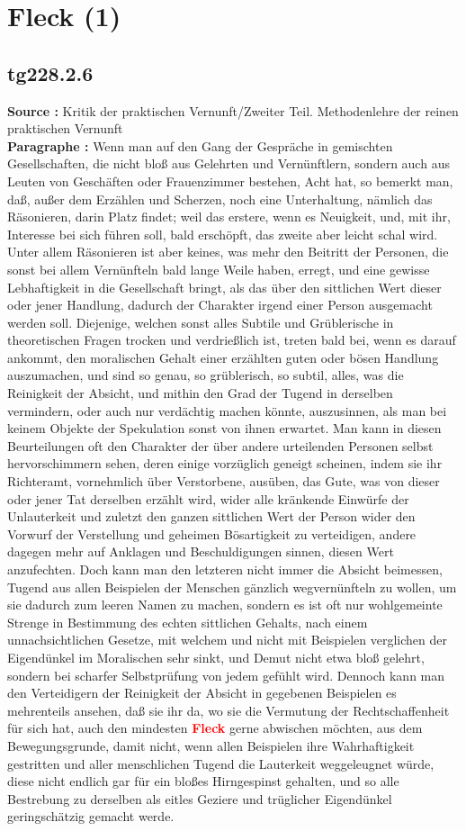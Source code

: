 \documentclass[a4paper,12pt,twoside]{book}
\newcommand{\match}[1]{\textcolor{red}{\textbf{#1}}}
\newcommand{\unnumberedsection}[1]{
	\section*{#1}
	\addcontentsline{toc}{section}{#1}
	\markright{#1}
}
\begin{document}
	\unnumberedsection{Fleck (1)} 
	\subsection*{tg228.2.6} 
	\textbf{Source : }Kritik der praktischen Vernunft/Zweiter Teil. Methodenlehre der reinen praktischen Vernunft\\  
	
	\noindent\textbf{Paragraphe : }Wenn man auf den Gang der Gespräche in gemischten Gesellschaften, die nicht bloß aus Gelehrten und Vernünftlern, sondern auch aus Leuten von Geschäften oder Frauenzimmer bestehen, Acht hat, so bemerkt man, daß, außer dem Erzählen und Scherzen, noch eine Unterhaltung, nämlich das Räsonieren, darin Platz findet; weil das erstere, wenn es Neuigkeit, und, mit ihr, Interesse bei sich führen soll, bald erschöpft, das zweite aber leicht schal wird. Unter allem Räsonieren ist aber keines, was mehr den Beitritt der Personen, die sonst bei allem Vernünfteln bald lange Weile haben, erregt, und eine gewisse Lebhaftigkeit in die Gesellschaft bringt, als das über den sittlichen Wert dieser oder jener Handlung, dadurch der Charakter irgend einer Person ausgemacht werden soll. Diejenige, welchen sonst alles Subtile und Grüblerische in theoretischen Fragen trocken und verdrießlich ist, treten bald bei, wenn es darauf ankommt, den moralischen Gehalt einer erzählten guten oder bösen Handlung auszumachen, und sind so genau, so grüblerisch, so subtil, alles, was die Reinigkeit der Absicht, und mithin  den Grad der Tugend in derselben vermindern, oder auch nur verdächtig machen könnte, auszusinnen, als man bei keinem Objekte der Spekulation sonst von ihnen erwartet. Man kann in diesen Beurteilungen oft den Charakter der über andere urteilenden Personen selbst hervorschimmern sehen, deren einige vorzüglich geneigt scheinen, indem sie ihr Richteramt, vornehmlich über Verstorbene, ausüben, das Gute, was von dieser oder jener Tat derselben erzählt wird, wider alle kränkende Einwürfe der Unlauterkeit und zuletzt den ganzen sittlichen Wert der Person wider den Vorwurf der Verstellung und geheimen Bösartigkeit zu verteidigen, andere dagegen mehr auf Anklagen und Beschuldigungen sinnen, diesen Wert anzufechten. Doch kann man den letzteren nicht immer die Absicht beimessen, Tugend aus allen Beispielen der Menschen gänzlich wegvernünfteln zu wollen, um sie dadurch zum leeren Namen zu machen, sondern es ist oft nur wohlgemeinte Strenge in Bestimmung des echten sittlichen Gehalts, nach einem unnachsichtlichen Gesetze, mit welchem und nicht mit Beispielen verglichen der Eigendünkel im Moralischen sehr sinkt, und Demut nicht etwa bloß gelehrt, sondern bei scharfer Selbstprüfung von jedem gefühlt wird. Dennoch kann man den Verteidigern der Reinigkeit der Absicht in gegebenen Beispielen es mehrenteils ansehen, daß sie ihr da, wo sie die Vermutung der Rechtschaffenheit für sich hat, auch den mindesten \match{Fleck} gerne abwischen möchten, aus dem Bewegungsgrunde, damit nicht, wenn allen Beispielen ihre Wahrhaftigkeit gestritten und aller menschlichen Tugend die Lauterkeit weggeleugnet würde, diese nicht endlich gar für ein bloßes Hirngespinst gehalten, und so alle Bestrebung zu derselben als eitles Geziere und trüglicher Eigendünkel geringschätzig gemacht werde. 
	
\end{document}
